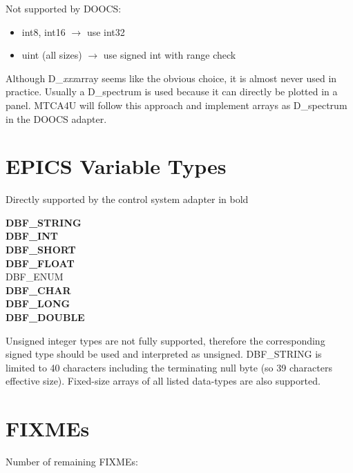\documentclass[11pt,a4paper]{scrartcl}
\newcounter{nFixmes}
\begin{document}
Not supported by DOOCS:
\begin{itemize}
\item int8, int16 $\rightarrow$ use int32
\item uint (all sizes) $\rightarrow$ use signed int with range check
\end{itemize}

Although D\_\textit{xxx}array seems like the obvious choice, it is almost never used in practice.
Usually a D\_spectrum is used because it can directly be plotted in a panel. MTCA4U
will follow this approach and implement arrays as D\_spectrum in the DOOCS adapter.

\section{EPICS Variable Types}
Directly supported by the control system adapter in bold
\begin{multicols}{3}
\noindent \textbf{DBF\_STRING}\\
\textbf{DBF\_INT}\\
\textbf{DBF\_SHORT}\\
\textbf{DBF\_FLOAT}\\
DBF\_ENUM\\
\textbf{DBF\_CHAR}\\
\textbf{DBF\_LONG}\\
\textbf{DBF\_DOUBLE}
\end{multicols}

Unsigned integer types are not fully supported, therefore the corresponding
signed type should be used and interpreted as unsigned. DBF\_STRING is
limited to 40 characters including the terminating null byte (so 39
characters effective size). Fixed-size arrays of all listed data-types
are also supported.

\section{FIXMEs}
Number of remaining FIXMEs: 
\end{document}

